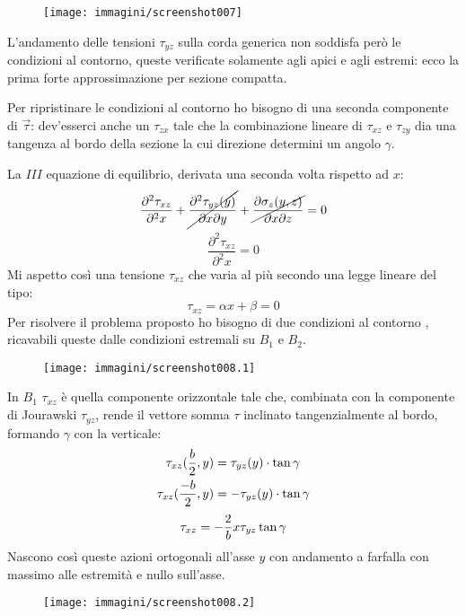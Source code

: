 \documentclass{article}
\begin{document}
\begin{adjustwidth}{2in}{}
\begin{figure}[H]
	\centering
	\label{fig:screenshot007}
	\texttt{[image: immagini/screenshot007]}
\end{figure}

		L'andamento delle tensioni $\tau_{yz}$ sulla corda generica non soddisfa però le condizioni al contorno, queste verificate solamente agli apici e agli estremi: ecco la prima forte approssimazione per sezione compatta. \newline 
		
		Per ripristinare le condizioni al contorno ho bisogno di una seconda componente di $\vec{\tau}$: dev'esserci anche un $\tau_{zx}$ tale che la combinazione lineare di $\tau_{xz}$ e $\tau_{zy}$ dia una tangenza al bordo della sezione la cui direzione determini un angolo $\gamma$. \newline
		
		La $III$ equazione di equilibrio, derivata una seconda volta rispetto ad $x$:
		\[\frac{\partial^2 \tau_{xz}}{\partial^2 x} + \cancel{\frac{\partial^2 \tau_{yz}(y)}{\partial x\partial y}} + \cancel{\frac{\partial\sigma_z(y,z)}{\partial x\partial z}}  =0\]
		\[ \frac{\partial^2 \tau_{xz}}{\partial^2 x} = 0\]
		Mi aspetto così una tensione $\tau_{xz}$ che varia al più secondo una legge lineare del tipo: 
		\[\tau_{xz} = \alpha x + \beta = 0\]
		Per risolvere il problema proposto ho bisogno di due condizioni al contorno , ricavabili queste dalle condizioni estremali su $B_1$ e $ B_2 $. 
		
\begin{figure}[H]
	\centering
	\label{fig:screenshot008.1}
	\texttt{[image: immagini/screenshot008.1]}
\end{figure}
		
		In $B_1$ $ \tau_{xz} $ è quella componente orizzontale tale che, combinata con la componente di Jourawski $ \tau_{yz} $, rende il vettore somma $\tau$ inclinato tangenzialmente al bordo, formando $\gamma$ con la verticale:
		\[ \begin{aligned}
			\tau_{xz}({b\over 2}, y) & = \tau_{yz}(y)\cdot \tan\gamma \\
			\tau_{xz}({-b\over 2}, y) & = -\tau_{yz}(y)\cdot \tan\gamma
		\end{aligned}\]
	 	\[ \tau_{xz} = -{2\over b}x\tau_{yz}\tan\gamma\]
	 	Nascono così queste azioni ortogonali all'asse $y$ con andamento a farfalla con massimo alle estremità e nullo sull'asse. 
	 	
\begin{figure}[H]
	\centering
	\label{fig:screenshot008.2}
	\texttt{[image: immagini/screenshot008.2]}
\end{figure}


\end{adjustwidth}
\end{document}
